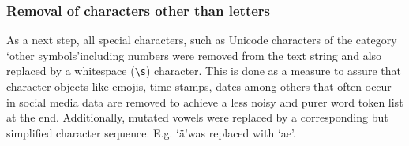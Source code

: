 \subsubsection{Removal of characters other than letters} \label{remove_eveything_but_letters}
As a next step, all special characters, such as Unicode characters of the category \lq other symbols\rq including numbers were removed from the text string and also replaced by a whitespace (\texttt{\backslash s}) character. This is done as a measure to assure that character objects like emojis, time-stamps, dates among others that often occur in social media data are removed to achieve a less noisy and purer word token list at the end. Additionally, mutated vowels were replaced by a corresponding but simplified character sequence. E.g. \lq ä\rq was replaced with \lq ae\rq.




